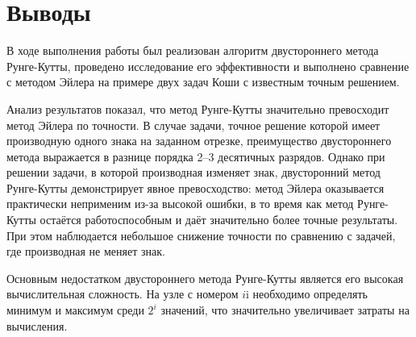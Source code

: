 \section {Выводы}

В ходе выполнения работы был реализован алгоритм двустороннего метода Рунге-Кутты, проведено исследование его эффективности и выполнено сравнение с методом Эйлера на примере двух задач Коши с известным точным решением.

Анализ результатов показал, что метод Рунге-Кутты значительно превосходит метод Эйлера по точности. В случае задачи, точное решение которой имеет производную одного знака на заданном отрезке, преимущество двустороннего метода выражается в разнице порядка 2–3 десятичных разрядов. Однако при решении задачи, в которой производная изменяет знак, двусторонний метод Рунге-Кутты демонстрирует явное превосходство: метод Эйлера оказывается практически неприменим из-за высокой ошибки, в то время как метод Рунге-Кутты остаётся работоспособным и даёт значительно более точные результаты. При этом наблюдается небольшое снижение точности по сравнению с задачей, где производная не меняет знак.

Основным недостатком двустороннего метода Рунге-Кутты является его высокая вычислительная сложность. На узле с номером $i$i необходимо определять минимум и максимум среди $2^i$ значений, что значительно увеличивает затраты на вычисления.
